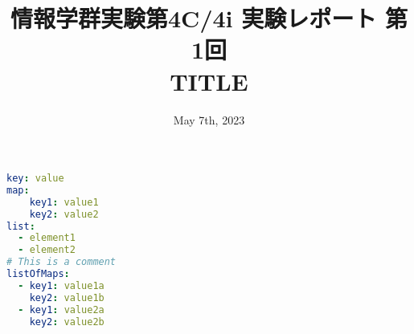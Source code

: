 \documentclass[twoside]{ltjsreport}
\title{{\normalsize 情報学群実験第4C/4i 実験レポート 第1回}\\TITLE}
\date{May 7th, 2023}
\begin{document}
\maketitle
{}\thispagestyle{plain}
\tableofcontents
\newpage
\pagestyle{report}
\setcounter{page}{1}

\begin{lstlisting}[language=yaml]
key: value
map:
    key1: value1
    key2: value2
list:
  - element1
  - element2
# This is a comment
listOfMaps:
  - key1: value1a
    key2: value1b
  - key1: value2a
    key2: value2b
\end{lstlisting}
\end{document}
